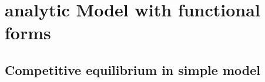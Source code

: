 \section{analytic Model with  functional forms}
\subsection{Competitive equilibrium in simple model}

